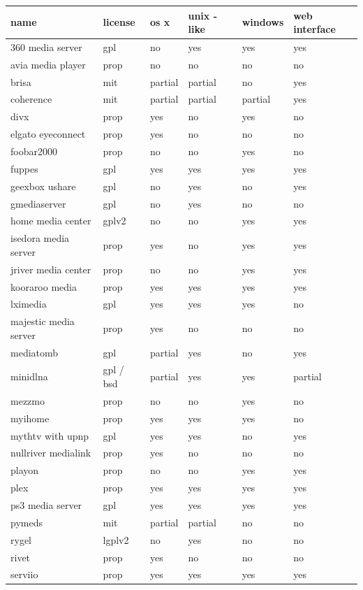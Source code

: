 \documentclass{article}
\begin{document}
\begin{tabular}{llllll}
\toprule
name & license & os x & unix - like & windows & web interface \\
\midrule
360 media server & gpl & no & yes & yes & yes \\
avia media player & prop & no & no & no & no \\
brisa & mit & partial & partial & no & yes \\
coherence & mit & partial & partial & partial & yes \\
divx & prop & yes & no & yes & no \\
elgato eyeconnect & prop & yes & no & no & no \\
foobar2000 & prop & no & no & yes & no \\
fuppes & gpl & yes & yes & yes & yes \\
geexbox ushare & gpl & no & yes & no & yes \\
gmediaserver & gpl & no & yes & no & no \\
home media center & gplv2 & no & no & yes & yes \\
isedora media server & prop & yes & no & yes & yes \\
jriver media center & prop & no & no & yes & yes \\
kooraroo media & prop & yes & yes & yes & yes \\
lximedia & gpl & yes & yes & yes & no \\
majestic media server & prop & yes & no & no & no \\
mediatomb & gpl & partial & yes & no & yes \\
minidlna & gpl / bsd & partial & yes & yes & partial \\
mezzmo & prop & no & no & yes & no \\
myihome & prop & yes & yes & yes & no \\
mythtv with upnp & gpl & yes & yes & no & yes \\
nullriver medialink & prop & yes & no & no & no \\
playon & prop & no & no & yes & yes \\
plex & prop & yes & yes & yes & yes \\
ps3 media server & gpl & yes & yes & yes & yes \\
pymeds & mit & partial & partial & no & no \\
rygel & lgplv2 & no & yes & no & no \\
rivet & prop & yes & no & no & no \\
serviio & prop & yes & yes & yes & yes \\

\end{tabular}
\end{document}
